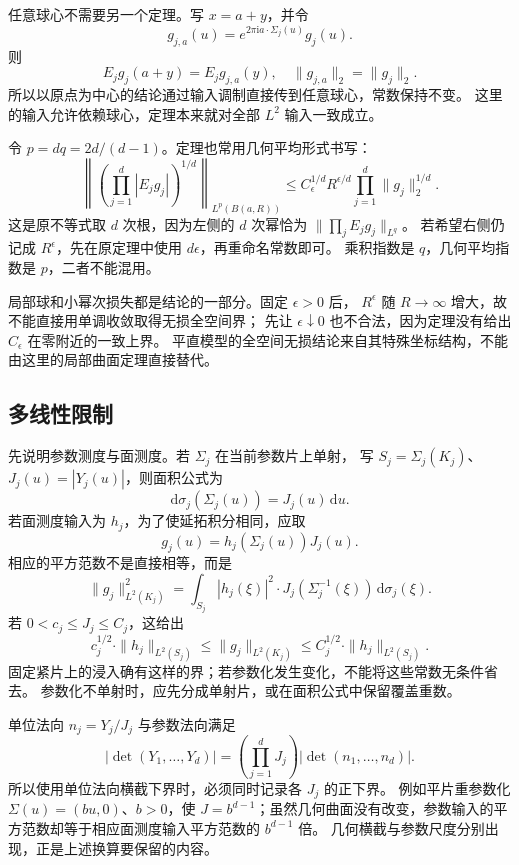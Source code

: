 任意球心不需要另一个定理。写 \(x=a+y\)，并令
\[
 g_{j,a}(u)=e^{2\pi\mathrm ia\cdot\Sigma_j(u)}g_j(u).
\]
则
\[
 E_jg_j(a+y)=E_jg_{j,a}(y),\quad
 \|g_{j,a}\|_2=\|g_j\|_2.
\]
所以以原点为中心的结论通过输入调制直接传到任意球心，常数保持不变。
这里的输入允许依赖球心，定理本来就对全部 \(L^2\) 输入一致成立。

\ProseParagraphBreak
令 \(p=dq=2d/(d-1)\)。定理也常用几何平均形式书写：
\begin{equation}\label{b2:eq:25-bct-geometric-mean}
 \left\|\left(\prod_{j=1}^d|E_jg_j|\right)^{1/d}
 \right\|_{L^p(B(a,R))}
 \leq C_\epsilon^{1/d}R^{\epsilon/d}
 \prod_{j=1}^d\|g_j\|_2^{1/d}.
\end{equation}
这是原不等式取 \(d\) 次根，因为左侧的 \(d\) 次幂恰为
\(\|\prod_jE_jg_j\|_{L^q}\)。
若希望右侧仍记成 \(R^\epsilon\)，先在原定理中使用 \(d\epsilon\)，再重命名常数即可。
乘积指数是 \(q\)，几何平均指数是 \(p\)，二者不能混用。

局部球和小幂次损失都是结论的一部分。固定 \(\epsilon>0\) 后，
\(R^\epsilon\) 随 \(R\to\infty\) 增大，故不能直接用单调收敛取得无损全空间界；
先让 \(\epsilon\downarrow0\) 也不合法，因为定理没有给出
\(C_\epsilon\) 在零附近的一致上界。
平直模型的全空间无损结论来自其特殊坐标结构，不能由这里的局部曲面定理直接替代。

\subsection{多线性限制}
\label{b2:subsec:250402}

先说明参数测度与面测度。若 \(\Sigma_j\) 在当前参数片上单射，
写 \(S_j=\Sigma_j(K_j)\)、\(J_j(u)=|Y_j(u)|\)，则面积公式为
\[
 \mathrm d\sigma_j(\Sigma_j(u))=J_j(u)\,\mathrm du.
\]
若面测度输入为 \(h_j\)，为了使延拓积分相同，应取
\[
 g_j(u)=h_j(\Sigma_j(u))J_j(u).
\]
相应的平方范数不是直接相等，而是
\[
 \|g_j\|_{L^2(K_j)}^2
 =\int_{S_j}|h_j(\xi)|^2
 \cdot J_j(\Sigma_j^{-1}(\xi))\,\mathrm d\sigma_j(\xi).
\]
若 \(0<c_j\leq J_j\leq C_j\)，这给出
\[
 c_j^{1/2}\cdot\|h_j\|_{L^2(S_j)}
 \leq\|g_j\|_{L^2(K_j)}
 \leq C_j^{1/2}\cdot\|h_j\|_{L^2(S_j)}.
\]
固定紧片上的浸入确有这样的界；若参数化发生变化，不能将这些常数无条件省去。
参数化不单射时，应先分成单射片，或在面积公式中保留覆盖重数。

\ProseParagraphBreak
单位法向 \(n_j=Y_j/J_j\) 与参数法向满足
\[
 |\det(Y_1,\ldots,Y_d)|
 =\left(\prod_{j=1}^dJ_j\right)
 |\det(n_1,\ldots,n_d)|.
\]
所以使用单位法向横截下界时，必须同时记录各 \(J_j\) 的正下界。
例如平片重参数化 \(\Sigma(u)=(bu,0)\)、\(b>0\)，使
\(J=b^{d-1}\)；虽然几何曲面没有改变，参数输入的平方范数却等于相应面测度输入平方范数的 \(b^{d-1}\) 倍。
几何横截与参数尺度分别出现，正是上述换算要保留的内容。

